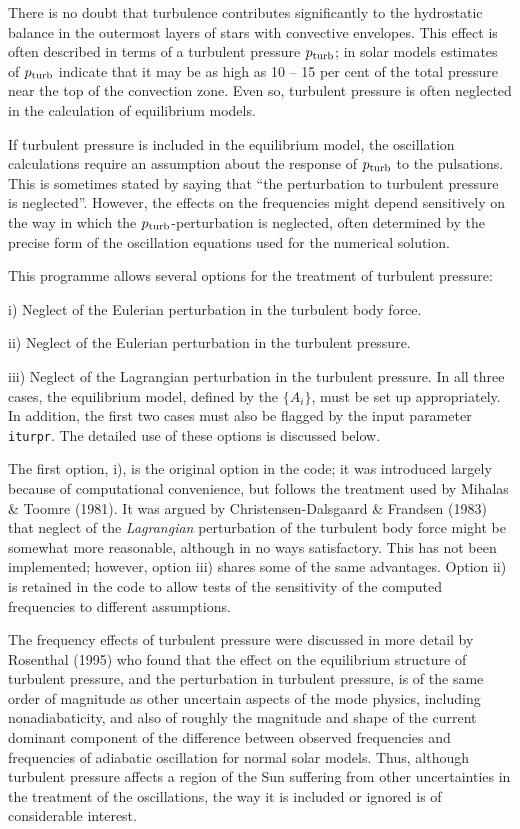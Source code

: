 There is no doubt that turbulence contributes significantly
to the hydrostatic balance in the outermost layers of
stars with convective envelopes.
This effect is often described in terms of a turbulent pressure $p_{\rm turb}$;
in solar models estimates of $p_{\rm turb}$ indicate that it may
be as high as 10 -- 15 per cent of the total pressure
near the top of the convection zone.
Even so, turbulent pressure is often neglected in the
calculation of equilibrium models.

If turbulent pressure is included in the equilibrium model,
the oscillation calculations require an assumption about
the response of $p_{\rm turb}$ to the pulsations.
This is sometimes stated by saying that ``the perturbation
to turbulent pressure is neglected''.
However, the effects on the frequencies might depend
sensitively on the way in which the $p_{\rm turb}$-perturbation
is neglected, often determined by the precise form of
the oscillation equations used for the numerical solution.

This programme allows several options for the treatment
of turbulent pressure:
\medskip
\item{i)}
Neglect of the Eulerian perturbation in the turbulent body force.
\item{ii)} 
Neglect of the Eulerian perturbation in the turbulent pressure.
\item{iii)} 
Neglect of the Lagrangian perturbation in the turbulent pressure.
\medskip
In all three cases, the equilibrium model, defined by the
$\{A_i\}$, must be set up appropriately.
In addition, the first two cases must also be flagged by
the input parameter {\tt iturpr}.
The detailed use of these options is discussed below.

The first option, i), is the original option in the code;
it was introduced largely because of computational
convenience, but follows the treatment used by Mihalas \& Toomre (1981).
It was argued by Christensen-Dalsgaard \& Frandsen (1983) that neglect
of the {\it Lagrangian} perturbation of the turbulent body force
might be somewhat more reasonable, although in no ways satisfactory.
This has not been implemented; however, option iii) shares some of the
same advantages.
Option ii) is retained in the code to allow tests of
the sensitivity of the computed frequencies to different assumptions.

The frequency effects of turbulent pressure were discussed in more detail by
Rosenthal {\etal} (1995) who found that the effect on the
equilibrium structure of turbulent pressure,
and the perturbation in turbulent pressure,
is of the same order of magnitude as other uncertain aspects
of the mode physics, including nonadiabaticity, and 
also of roughly the magnitude and shape of the current dominant
component of the difference between observed frequencies
and frequencies of adiabatic oscillation for normal solar models.
Thus, although turbulent pressure affects a region of the
Sun suffering from other uncertainties in the treatment of
the oscillations, the way it is included or ignored is
of considerable interest.

